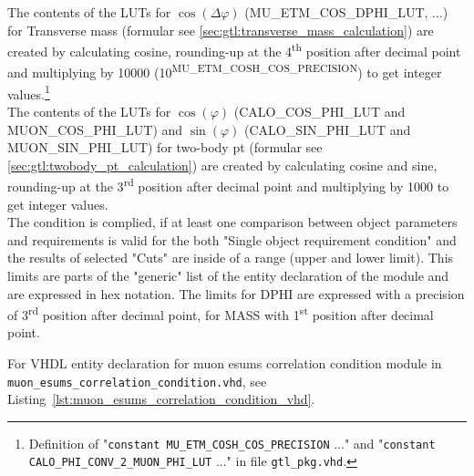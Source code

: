 The contents of the LUTs for $\cos(\Delta\varphi)$ (\small{MU\_ETM\_COS\_DPHI\_LUT}\normalsize, ...) for Transverse mass (formular see \ref{sec:gtl:transverse_mass_calculation}) 
are created by calculating cosine, rounding-up at the 4\textsuperscript{th} 
position after decimal point and multiplying by 10000 (10\textsuperscript{\tiny{MU\_ETM\_COSH\_COS\_PRECISION}}\normalsize) to get integer values.\footnote{Definition of 
"\texttt{constant \small{MU\_ETM\_COSH\_COS\_PRECISION}\normalsize} ..." and "\texttt{constant \small{CALO\_PHI\_CONV\_2\_MUON\_PHI\_LUT}\normalsize} ..." in file \texttt{gtl\_pkg.vhd}.}\\
The contents of the LUTs for $\cos(\varphi)$ (\small{CALO\_COS\_PHI\_LUT and MUON\_COS\_PHI\_LUT}\normalsize) and $\sin(\varphi)$ (\small{CALO\_SIN\_PHI\_LUT and MUON\_SIN\_PHI\_LUT}\normalsize) for two-body pt 
(formular see \ref{sec:gtl:twobody_pt_calculation}) are created by calculating cosine and sine, rounding-up at the 3\textsuperscript{rd} position after decimal point and multiplying by 1000 to get integer values.\\
The condition is complied, if at least one comparison between object parameters and requirements is valid for the both "Single object requirement condition"
and the results of selected "Cuts" are inside of a range (upper and lower limit).
This limits are parts of the "generic" list of the entity declaration of the module and are expressed in hex notation. The limits for DPHI
are expressed with a precision of 3\textsuperscript{rd} position after decimal point, for MASS with 1\textsuperscript{st} position after decimal point.

For VHDL entity declaration for muon esums correlation condition module in \texttt{muon\_esums\_correlation\_condition.vhd}, see Listing~\ref{lst:muon_esums_correlation_condition_vhd}.\\


\clearpage


